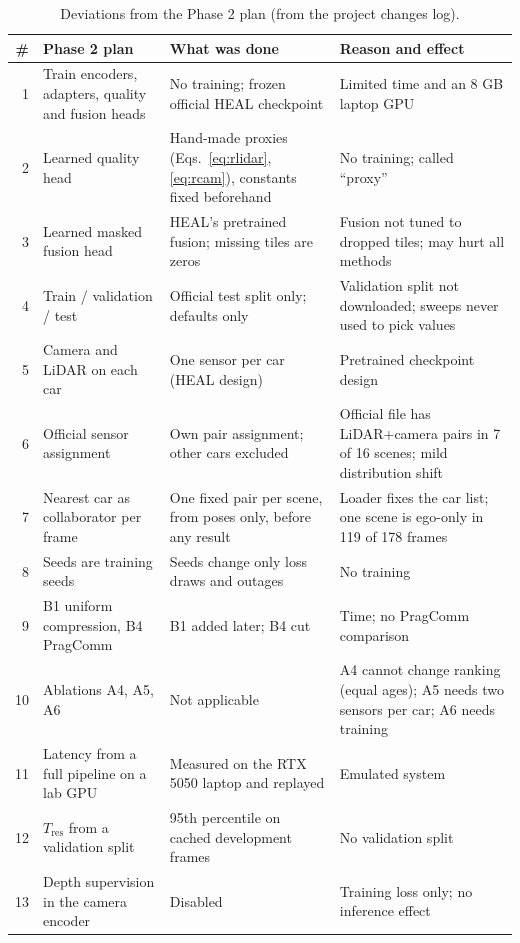 \documentclass[conference]{IEEEtran}
\begin{document}
\begin{table}[t]
\caption{Deviations from the Phase 2 plan (from the project changes log).}\label{tab:dev}
\centering\scriptsize\setlength{\tabcolsep}{3pt}
\begin{tabular}{r >{\raggedright\arraybackslash}p{4.6cm} >{\raggedright\arraybackslash}p{5.2cm} >{\raggedright\arraybackslash}p{6.2cm}}
\toprule
\# & Phase 2 plan & What was done & Reason and effect\\\midrule
1 & Train encoders, adapters, quality and fusion heads & No training; frozen official HEAL checkpoint & Limited time and an 8 GB laptop GPU\\
2 & Learned quality head & Hand-made proxies (Eqs.~\ref{eq:rlidar}, \ref{eq:rcam}), constants fixed beforehand & No training; called ``proxy''\\
3 & Learned masked fusion head & HEAL's pretrained fusion; missing tiles are zeros & Fusion not tuned to dropped tiles; may hurt all methods\\
4 & Train / validation / test & Official test split only; defaults only & Validation split not downloaded; sweeps never used to pick values\\
5 & Camera and LiDAR on each car & One sensor per car (HEAL design) & Pretrained checkpoint design\\
6 & Official sensor assignment & Own pair assignment; other cars excluded & Official file has LiDAR+camera pairs in 7 of 16 scenes; mild distribution shift\\
7 & Nearest car as collaborator per frame & One fixed pair per scene, from poses only, before any result & Loader fixes the car list; one scene is ego-only in 119 of 178 frames\\
8 & Seeds are training seeds & Seeds change only loss draws and outages & No training\\
9 & B1 uniform compression, B4 PragComm & B1 added later; B4 cut & Time; no PragComm comparison\\
10 & Ablations A4, A5, A6 & Not applicable & A4 cannot change ranking (equal ages); A5 needs two sensors per car; A6 needs training\\
11 & Latency from a full pipeline on a lab GPU & Measured on the RTX 5050 laptop and replayed & Emulated system\\
12 & $T_{\mathrm{res}}$ from a validation split & 95th percentile on cached development frames & No validation split\\
13 & Depth supervision in the camera encoder & Disabled & Training loss only; no inference effect\\

\end{tabular}
\end{table}
\end{document}
